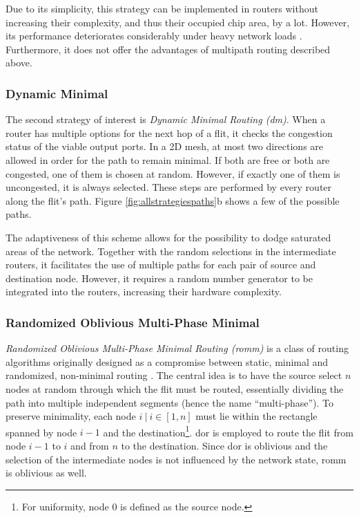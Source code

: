 Due to its simplicity, this strategy can be implemented in routers without increasing their complexity, and thus their occupied chip area, by a lot.
However, its performance deteriorates considerably under heavy network loads \cite[3]{nesson95romm}. Furthermore, it does not offer the advantages of
multipath routing described above.

\subsubsection{Dynamic Minimal}\label{subsubsec:dm}
The second strategy of interest is \textit{Dynamic Minimal Routing (\gls{dm})}. When a router has multiple options for the next hop of a flit, it checks
the congestion status of the viable output ports. In a 2D mesh, at most two directions are allowed in order for the path to remain minimal. If both
are free or both are congested, one of them is chosen at random. However, if exactly one of them is uncongested, it is always selected.
These steps are performed by every router along the flit's path. Figure \ref{fig:allstrategiespaths}b shows a few of the possible paths.

The adaptiveness of this scheme allows for the possibility to dodge saturated areas of the network. Together with the random selections in the
intermediate routers, it facilitates the use of multiple paths for each pair of source and destination node. However, it requires a random number
generator to be integrated into the routers, increasing their hardware complexity.

\subsubsection{Randomized Oblivious Multi-Phase Minimal}\label{subsubsec:romm}
\textit{Randomized Oblivious Multi-Phase Minimal Routing (\gls{romm})} is a class of routing algorithms originally designed as a compromise between
static, minimal and randomized, non-minimal routing \cite[3]{nesson95romm}. The central idea is to have the source select $n$ nodes at random
through which the flit must be routed, essentially dividing the path into multiple independent segments (hence the name \enquote{multi-phase}). To
preserve minimality, each node $i\ |\ i \in [1,n]$ must lie within the rectangle spanned by node $i-1$ and the destination\footnote{For uniformity,
node $0$ is defined as the source node.}. \Gls{dor} is employed to route the flit from node $i-1$ to $i$ and from $n$ to the
destination. Since \gls{dor} is oblivious and the selection of the intermediate nodes is not influenced by the network state, \gls{romm} is oblivious
as well.

